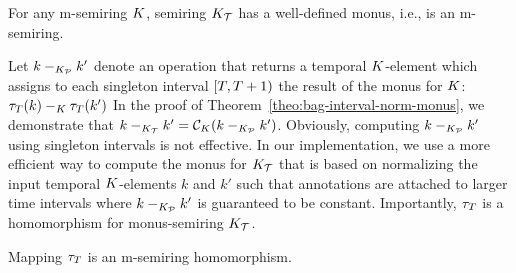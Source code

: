 \begin{theo}\label{theo:bag-interval-norm-monus}
For any m-semiring $K$, semiring $K_{\mathcal{T}}$ has a well-defined monus, i.e., is an m-semiring. %
\end{theo}

Let $k -_{K_{\mathcal{P}}} k'$ denote an operation that returns a temporal $K$-element which assigns to each singleton interval $[T,T+1)$ the result of the monus for $K$: $\tau_{T}(k) -_{K} \tau_{T}(k')$ 
In the proof of Theorem~\ref{theo:bag-interval-norm-monus}, we demonstrate that $k -_{K_{\mathcal{T}}} k' = \mathcal{C}_{{K}}(k -_{K_{\mathcal{P}}} k')$. Obviously, computing $k -_{K_{\mathcal{P}}} k'$ using singleton intervals is not effective. In our implementation, we use a more efficient way to compute the monus for $K_{\mathcal{T}}$ that is based on normalizing the input temporal $K$-elements $k$ and $k'$ such that annotations are attached to larger time intervals where $k -_{K_{\mathcal{P}}} k'$ is guaranteed to be constant.
Importantly, $\tau_{T}$ is a homomorphism for monus-semiring $K_{\mathcal{T}}$.

\begin{theo}\label{theo:bag-interval-norm-monus-homo}
  Mapping $\tau_{T}$ is an m-semiring homomorphism. %
\end{theo}

